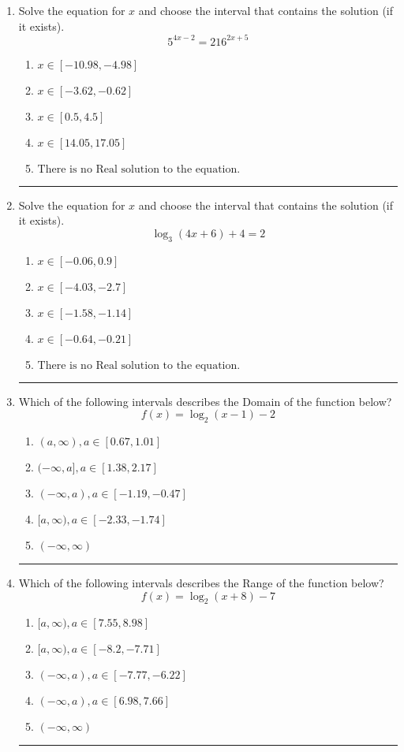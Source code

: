 \documentclass[14pt]{extbook}
\newcommand{\litem}[1]{\item#1\hspace*{-1cm}\rule{\textwidth}{0.4pt}}
\begin{document}
\begin{enumerate}
{\begin{enumerate}[label=\Alph*.]
\end{enumerate} }
\litem{
Solve the equation for $x$ and choose the interval that contains the solution (if it exists).\[ 5^{4x-2} = 216^{2x+5} \]\begin{enumerate}[label=\Alph*.]
\item \( x \in [-10.98, -4.98] \)
\item \( x \in [-3.62, -0.62] \)
\item \( x \in [0.5, 4.5] \)
\item \( x \in [14.05, 17.05] \)
\item \( \text{There is no Real solution to the equation.} \)

\end{enumerate} }
\litem{
Solve the equation for $x$ and choose the interval that contains the solution (if it exists).\[ \log_{3}{(4x+6)}+4 = 2 \]\begin{enumerate}[label=\Alph*.]
\item \( x \in [-0.06, 0.9] \)
\item \( x \in [-4.03, -2.7] \)
\item \( x \in [-1.58, -1.14] \)
\item \( x \in [-0.64, -0.21] \)
\item \( \text{There is no Real solution to the equation.} \)

\end{enumerate} }
\litem{
Which of the following intervals describes the Domain of the function below?\[ f(x) = \log_2{(x-1)}-2 \]\begin{enumerate}[label=\Alph*.]
\item \( (a, \infty), a \in [0.67, 1.01] \)
\item \( (-\infty, a], a \in [1.38, 2.17] \)
\item \( (-\infty, a), a \in [-1.19, -0.47] \)
\item \( [a, \infty), a \in [-2.33, -1.74] \)
\item \( (-\infty, \infty) \)

\end{enumerate} }
\litem{
Which of the following intervals describes the Range of the function below?\[ f(x) = \log_2{(x+8)}-7 \]\begin{enumerate}[label=\Alph*.]
\item \( [a, \infty), a \in [7.55, 8.98] \)
\item \( [a, \infty), a \in [-8.2, -7.71] \)
\item \( (-\infty, a), a \in [-7.77, -6.22] \)
\item \( (-\infty, a), a \in [6.98, 7.66] \)
\item \( (-\infty, \infty) \)


\end{enumerate}}
\end{enumerate}
\end{document}
